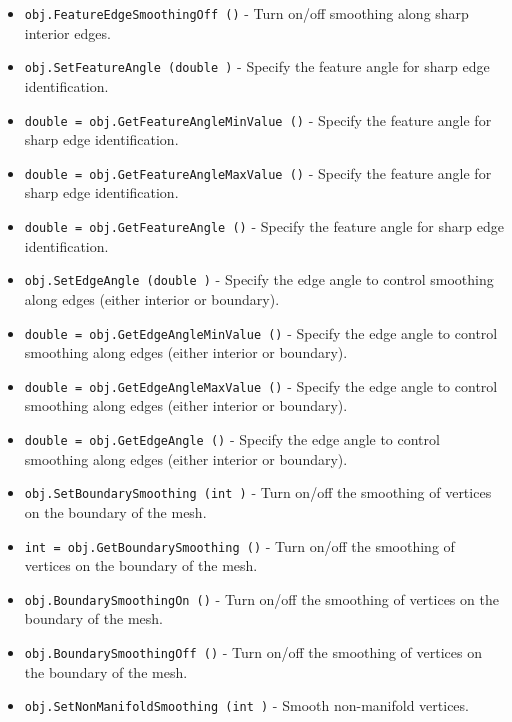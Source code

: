 \begin{itemize}
\item  \verb|obj.FeatureEdgeSmoothingOff ()| -  Turn on/off smoothing along sharp interior edges.

\item  \verb|obj.SetFeatureAngle (double )| -  Specify the feature angle for sharp edge identification.

\item  \verb|double = obj.GetFeatureAngleMinValue ()| -  Specify the feature angle for sharp edge identification.

\item  \verb|double = obj.GetFeatureAngleMaxValue ()| -  Specify the feature angle for sharp edge identification.

\item  \verb|double = obj.GetFeatureAngle ()| -  Specify the feature angle for sharp edge identification.

\item  \verb|obj.SetEdgeAngle (double )| -  Specify the edge angle to control smoothing along edges (either interior
 or boundary).

\item  \verb|double = obj.GetEdgeAngleMinValue ()| -  Specify the edge angle to control smoothing along edges (either interior
 or boundary).

\item  \verb|double = obj.GetEdgeAngleMaxValue ()| -  Specify the edge angle to control smoothing along edges (either interior
 or boundary).

\item  \verb|double = obj.GetEdgeAngle ()| -  Specify the edge angle to control smoothing along edges (either interior
 or boundary).

\item  \verb|obj.SetBoundarySmoothing (int )| -  Turn on/off the smoothing of vertices on the boundary of the mesh.

\item  \verb|int = obj.GetBoundarySmoothing ()| -  Turn on/off the smoothing of vertices on the boundary of the mesh.

\item  \verb|obj.BoundarySmoothingOn ()| -  Turn on/off the smoothing of vertices on the boundary of the mesh.

\item  \verb|obj.BoundarySmoothingOff ()| -  Turn on/off the smoothing of vertices on the boundary of the mesh.

\item  \verb|obj.SetNonManifoldSmoothing (int )| -  Smooth non-manifold vertices.


\end{itemize}

